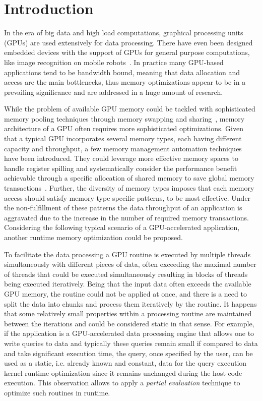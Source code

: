 \section*{Introduction}\label{sec:introduction}
In the era of big data and high load computations, graphical processing units
 (GPUs) are used extensively for data processing. 
 There have even been designed embedded devices with the support of GPUs
  for general purpose computations, like image recognition on mobile robots~\cite{NVJETSON}.
In practice many GPU-based applications tend to be bandwidth bound, meaning
 that data allocation and access are the main bottlenecks, thus memory optimizations
  appear to be in a prevailing significance and are addressed in a huge amount of research.

While the problem of available GPU memory could be tackled with sophisticated memory pooling techniques
 through memory swapping and sharing~\cite{zhang2019efficient},
  memory architecture of a GPU often requires more sophisticated optimizations.
   Given that a typical GPU incorporates several memory types, each having different
    capacity and throughput, a few memory management automation techniques have been introduced. They could leverage more effective memory spaces to handle register spilling and systematically consider the performance benefit achievable through a specific allocation of shared memory to save global memory transactions~\cite{AutomaticSharedMem,RegisterSpilling}. Further, the diversity of memory types imposes that each memory access should satisfy memory type specific patterns, to be most effective. Under the non-fulfillment of these patterns the data throughput of an application is aggravated due to the increase in the number of required memory transactions. Considering the following typical scenario of a GPU-accelerated application, another runtime memory optimization could be proposed.

 To facilitate the data processing a GPU routine is executed by multiple threads simultaneously with different pieces of data, often exceeding the maximal number of threads
  that could be executed simultaneously resulting in blocks of threads being executed iteratively.
 Being that the input data often exceeds the available GPU memory, the routine could not be applied at once, 
 and there is a need to split the data into chunks and process them iteratively 
 by the routine.
 It happens that some relatively small properties within a processing routine are maintained between the iterations
  and could be considered static in that sense.
 For example, if the application is a GPU-accelerated data processing engine that allows one to write queries to data and typically these queries remain small if compared to data and take significant execution time, the query, once specified by the user, can be used as a static, i.e. already known and constant, data for the query execution kernel runtime optimization since it remains unchanged during the host code execution.
 This observation allows to apply a \textit{partial evaluation} technique to optimize such routines in runtime.

